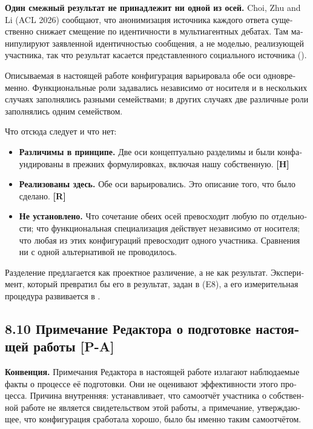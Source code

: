 \begin{russian}
\textbf{Один смежный результат не принадлежит ни одной из осей.} \gcheck{} Choi, Zhu and Li (ACL 2026) сообщают, что анонимизация источника каждого ответа существенно снижает смещение по идентичности в мультиагентных дебатах. Там манипулируют заявленной идентичностью сообщения, а не моделью, реализующей участника, так что результат касается представленного социального источника ().

Описываемая в настоящей работе конфигурация варьировала обе оси одновременно. Функциональные роли задавались независимо от носителя и в нескольких случаях заполнялись разными семействами; в других случаях две различные роли заполнялись одним семейством.

Что отсюда следует и что нет:

\begin{itemize}
  \item \textbf{Различимы в принципе.} Две оси концептуально разделимы и были конфаундированы в прежних формулировках, включая нашу собственную. \textbf{[H]}
  \item \textbf{Реализованы здесь.} Обе оси варьировались. Это описание того, что было сделано. \textbf{[R]}
  \item \textbf{Не установлено.} Что сочетание обеих осей превосходит любую по отдельности; что функциональная специализация действует независимо от носителя; что любая из этих конфигураций превосходит одного участника. Сравнения ни с одной альтернативой не проводилось.
\end{itemize}
Разделение предлагается как проектное различение, а не как результат. Эксперимент, который превратил бы его в результат, задан в  (E8), а его измерительная процедура развивается в .


\subsection*{8.10 Примечание Редактора о подготовке настоящей работы \textbf{[P-A]}}
\label{sec:ru:8.10}

\textbf{Конвенция.} Примечания Редактора в настоящей работе излагают наблюдаемые факты о процессе её подготовки. Они не оценивают эффективности этого процесса. Причина внутренняя:  устанавливает, что самоотчёт участника о собственной работе не является свидетельством этой работы, а примечание, утверждающее, что конфигурация сработала хорошо, было бы именно таким самоотчётом.


\end{russian}
